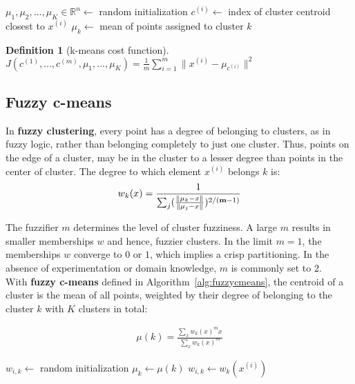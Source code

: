 \documentclass{report}
\newtheorem{definition}{Definition}[section]
\begin{document}
\begin{algorithm}
\caption{k-means}
\label{ref:kmeans}
\begin{algorithmic}
\State $\mu_1, \mu_2, ..., \mu_K \in \mathbb{R}^n \gets$ random initialization
\Repeat
{}
\State $c^{(i)} \gets$ index of cluster centroid closest to $x^{(i)}$
\EndFor
{}
\State $\mu_k \gets$ mean of points assigned to cluster $k$
\EndFor
{}
\end{algorithmic}
\end{algorithm}

\begin{definition}[k-means cost function]~\\
$J(c^{(1)}, ..., c^{(m)}, \mu_1, ..., \mu_K)=\frac{1}{m}\sum_{i=1}^m \lVert x^{(i)}-\mu_{c^{(i)}}\rVert^2 $
\end{definition}

\subsection{Fuzzy c-means}
In {\bf fuzzy clustering}, every point has a degree of belonging to clusters, as in fuzzy logic, rather than belonging completely to just one cluster.
Thus, points on the edge of a cluster, may be in the cluster to a lesser degree than points in the center of cluster.
The degree to which element $x^{(i)}$ belongs $k$ is:
\begin{align*}
w_k(x) = \frac{1}{\sum_j(\frac{\lVert \mu_k - x \Vert}{\lVert \mu_j - x \Vert})^{2/({\bf m}-1)}}
\end{align*}

The fuzzifier $m$ determines the level of cluster fuzziness.
A large $m$ results in smaller memberships $w$ and hence, fuzzier clusters.
In the limit $m = 1$, the memberships $w$ converge to $0$ or $1$, which implies a crisp partitioning.
In the absence of experimentation or domain knowledge, $m$ is commonly set to $2$. \\

With {\bf fuzzy c-means} defined in Algorithm~\ref{alg:fuzzycmeans}, the centroid of a cluster is the mean of all points, weighted by their degree of belonging to the cluster $k$ with $K$ clusters in total:

\begin{align*}
\mu(k) = \frac{\sum_x w_k(x)^mx}{\sum_x w_k(x)^m}
\end{align*}

\begin{algorithm}
\caption{Fuzzy c-means}
\label{alg:fuzzycmeans}
\begin{algorithmic}
\State $w_{i, k} \gets$ random initialization 
\Repeat
{}
\State $\mu_k \gets \mu(k)$ 
\EndFor
{}
\State $w_{i, k} \gets w_k(x^{(i)}) $ 
\EndFor
{}
\end{algorithmic}
\end{algorithm}
\end{document}
